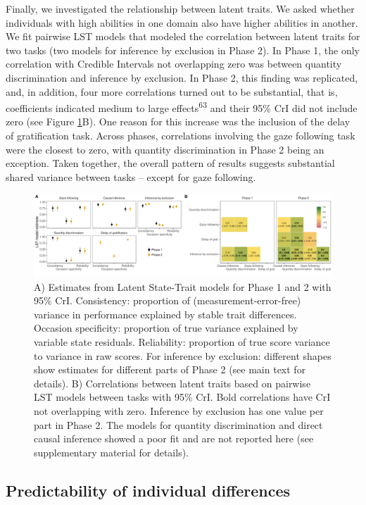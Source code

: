 \documentclass[
  man,floatsintext]{apa6}
\begin{document}
Finally, we investigated the relationship between latent traits. We asked whether individuals with high abilities in one domain also have higher abilities in another. We fit pairwise LST models that modeled the correlation between latent traits for two tasks (two models for inference by exclusion in Phase 2). In Phase 1, the only correlation with Credible Intervals not overlapping zero was between quantity discrimination and inference by exclusion. In Phase 2, this finding was replicated, and, in addition, four more correlations turned out to be substantial, that is, coefficients indicated medium to large effects\textsuperscript{63} and their 95\% CrI did not include zero (see Figure \ref{fig:lstmplot}B). One reason for this increase was the inclusion of the delay of gratification task. Across phases, correlations involving the gaze following task were the closest to zero, with quantity discrimination in Phase 2 being an exception. Taken together, the overall pattern of results suggests substantial shared variance between tasks -- except for gaze following.

\begin{figure}
\includegraphics[width=1\linewidth]{./figures/structure} \caption{A) Estimates from Latent State-Trait models for Phase 1 and 2 with 95\% CrI. Consistency: proportion of (measurement-error-free) variance in performance explained by stable trait differences. Occasion specificity: proportion of true variance explained by variable state residuals. Reliability: proportion of true score variance to variance in raw scores. For inference by exclusion: different shapes show estimates for different parts of Phase 2 (see main text for details). B) Correlations between latent traits based on pairwise LST models between tasks with 95\% CrI. Bold correlations have CrI not overlapping with zero. Inference by exclusion has one value per part in Phase 2. The models for quantity discrimination and direct causal inference showed a poor fit and are not reported here (see supplementary material for details).}\label{fig:lstmplot}
\end{figure}

\hypertarget{predictability-of-individual-differences}{%
\subsection{Predictability of individual differences}\label{predictability-of-individual-differences}}
\end{document}
